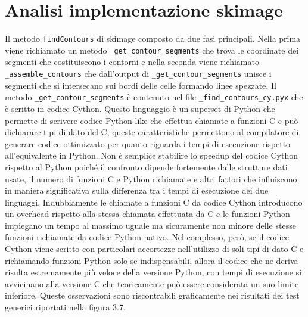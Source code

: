 \documentclass[12pt,a4paper]{report}
\begin{document}
\section{Analisi implementazione skimage}
Il metodo \verb|findContours| di skimage composto da due fasi principali. Nella prima viene richiamato un metodo \verb|_get_contour_segments| che trova le coordinate dei segmenti che costituiscono i contorni e nella seconda viene richiamato \verb|_assemble_contours| che dall'output di \verb|_get_contour_segments| unisce i segmenti che si intersecano sui bordi delle celle formando linee spezzate. \newline
Il metodo \verb|_get_contour_segments| è contenuto nel file \verb|_find_contours_cy.pyx| che è scritto in codice Cython. Questo linguaggio è un superset di Python che permette di scrivere codice Python-like che effettua chiamate a funzioni C e può dichiarare tipi di dato del C, queste caratteristiche permettono al compilatore di generare codice ottimizzato per quanto riguarda i tempi di esecuzione rispetto all'equivalente in Python. \newline
Non è semplice stabilire lo speedup del codice Cython rispetto al Python poiché il confronto dipende fortemente dalle strutture dati usate, il numero di funzioni C e Python richiamate e altri fattori che influiscono in maniera significativa sulla differenza tra i tempi di esecuzione dei due linguaggi. Indubbiamente le chiamate a funzioni C da codice Cython introducono un overhead rispetto alla stessa chiamata effettuata da C e le funzioni Python impiegano un tempo al massimo uguale ma sicuramente non minore delle stesse funzioni richiamate da codice Python nativo. \newline
Nel complesso, però, se il codice Cython viene scritto con particolari accortezze nell'utilizzo di soli tipi di dato C e richiamando funzioni Python solo se indispensabili, allora il codice che ne deriva risulta estremamente più veloce della versione Python, con tempi di esecuzione si avvicinano alla versione C che teoricamente può essere considerata un suo limite inferiore. Queste osservazioni sono riscontrabili graficamente nei risultati dei test generici riportati nella figura 3.7. 
\end{document}
